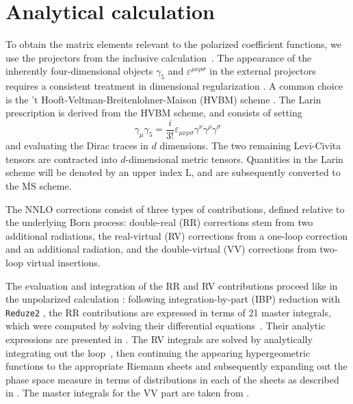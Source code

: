 \documentclass[10pt,aps,prl,twocolumn,preprintnumbers,nofootinbib]{revtex4-2}
\newcommand\MSbar{\overline{\mathrm{MS}}}
\newcommand{\Lar}{\mathrm{L}}
\newcommand{\HVBM}{HVBM}
\begin{document}
\section{Analytical calculation}
To obtain the matrix elements relevant to the polarized coefficient functions, we use the projectors from the inclusive calculation~\cite{Zijlstra:1993sh}. 
The appearance of the inherently four-dimensional objects $\gamma_5$ and $\varepsilon^{\mu\nu\rho\sigma}$ in the external projectors requires a consistent treatment in dimensional regularization \cite{tHooft:1972tcz}. 
A common choice is the 't Hooft-Veltman-Breitenlohner-Maison (\HVBM) scheme \cite{tHooft:1972tcz,Breitenlohner:1977hr}. 
The Larin prescription \cite{Larin:1991tj,Larin:1993tq} is derived from the \HVBM{} scheme, and consists of setting
\begin{equation}
    \gamma_\mu \gamma_5 = \frac{i}{3!} \varepsilon_{\mu\nu\rho\sigma}\gamma^{\nu}\gamma^{\rho}\gamma^{\sigma}
\end{equation}
and evaluating the Dirac traces in $d$ dimensions. 
The two remaining Levi-Civita tensors are contracted into $d$-dimensional metric tensors.
Quantities in the Larin scheme will be denoted by an upper index $\Lar$, and are subsequently converted to the $\MSbar$ \nolinebreak scheme.

The NNLO corrections consist of three types of contributions, defined relative to the underlying  Born process:
 double-real (RR) corrections stem from two additional radiations, the real-virtual (RV) corrections from a one-loop correction and an additional radiation, and the double-virtual (VV) corrections from two-loop virtual insertions.

The evaluation and integration of the RR and RV 
contributions 
proceed like in the unpolarized calculation \cite{Bonino:2024qbh}: following integration-by-part (IBP) reduction \cite{Chetyrkin:1981qh,Laporta:2000dsw} with \texttt{Reduze2} \cite{vonManteuffel:2012np}, the RR contributions are 
expressed in terms of 21 master integrals, which were 
computed by solving their differential equations~\cite{Gehrmann:1999as}. 
Their analytic
expressions 
are presented in \cite{Bonino:2024adk}. The RV integrals are solved by analytically integrating out the loop~\cite{Gehrmann:1999as}, then
continuing the appearing hypergeometric functions to the 
appropriate  Riemann sheets  and subsequently
expanding out the phase space measure in terms of 
distributions in each of the sheets as 
 described in \cite{Gehrmann:2022cih}. The master integrals for the VV part are taken from \cite{Gehrmann:2005pd}.
\end{document}
